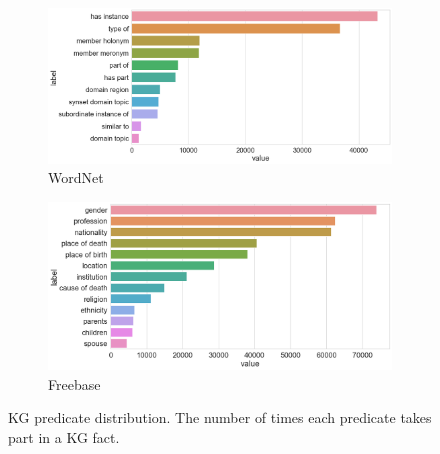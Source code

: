 \begin{figure}[H]
	\begin{subfigure}[b]{.5\linewidth}
   		\centering
    		\includegraphics[width=1.0\linewidth, height=0.7\linewidth]{Wordnet_Predicate_Counts}
		\captionsetup{justification=centering}
		\caption{WordNet}
	\end{subfigure}
	\begin{subfigure}[b]{.5\linewidth}
   		\centering
		\includegraphics[width=1.0\linewidth, height=0.7\linewidth]{Freebase_Predicate_Counts}
		\captionsetup{justification=centering}
		\caption{Freebase}
	\end{subfigure}
	\captionsetup{justification=centering}
	\caption{KG predicate distribution. The number of times each predicate takes part in a KG fact.}
\end{figure}

